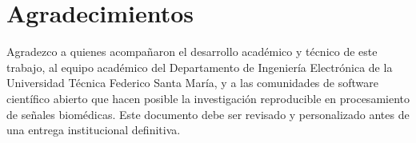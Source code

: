 \chapter*{Agradecimientos}
Agradezco a quienes acompañaron el desarrollo académico y técnico de este trabajo, al equipo académico del Departamento de Ingeniería Electrónica de la Universidad Técnica Federico Santa María, y a las comunidades de software científico abierto que hacen posible la investigación reproducible en procesamiento de señales biomédicas. Este documento debe ser revisado y personalizado antes de una entrega institucional definitiva.
